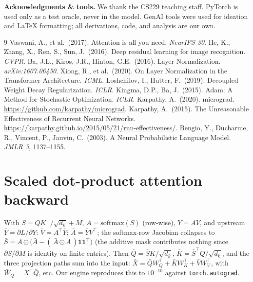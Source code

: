 \documentclass{article}
\begin{document}
\textbf{Acknowledgments \& tools.} We thank the CS229 teaching staff. PyTorch is used only as a test oracle, never in the model. GenAI tools were used for ideation and LaTeX formatting; all derivations, code, and analysis are our own.

{\footnotesize
\begin{thebibliography}{9}
 Vaswani, A., et al.\ (2017). Attention is all you need. \textit{NeurIPS 30}.
 He, K., Zhang, X., Ren, S., Sun, J.\ (2016). Deep residual learning for image recognition. \textit{CVPR}.
 Ba, J.L., Kiros, J.R., Hinton, G.E.\ (2016). Layer Normalization. \textit{arXiv:1607.06450}.
 Xiong, R., et al.\ (2020). On Layer Normalization in the Transformer Architecture. \textit{ICML}.
 Loshchilov, I., Hutter, F.\ (2019). Decoupled Weight Decay Regularization. \textit{ICLR}.
 Kingma, D.P., Ba, J.\ (2015). Adam: A Method for Stochastic Optimization. \textit{ICLR}.
 Karpathy, A.\ (2020). micrograd. \url{https://github.com/karpathy/micrograd}.
 Karpathy, A.\ (2015). The Unreasonable Effectiveness of Recurrent Neural Networks. \url{https://karpathy.github.io/2015/05/21/rnn-effectiveness/}.
 Bengio, Y., Ducharme, R., Vincent, P., Jauvin, C.\ (2003). A Neural Probabilistic Language Model. \textit{JMLR 3}, 1137--1155.
\end{thebibliography}
}

\appendix
\section{Scaled dot-product attention backward}\label{app:attn}
With $S=QK^\top/\sqrt{d_k}+M$, $A=\mathrm{softmax}(S)$ (row-wise), $Y=AV$, and upstream $\bar Y=\partial L/\partial Y$:
$\bar V = A^\top\bar Y$; $\bar A=\bar Y V^\top$; the softmax-row Jacobian collapses to $\bar S = A\odot\big(\bar A-(\,\bar A\odot A\,)\mathbf 1\mathbf 1^\top\big)$ (the additive mask contributes nothing since $\partial S/\partial M$ is identity on finite entries). Then $\bar Q=\bar S K/\sqrt{d_k}$, $\bar K=\bar S^\top Q/\sqrt{d_k}$, and the three projection paths sum into the input: $\bar X = \bar Q W_Q^\top+\bar K W_K^\top+\bar V W_V^\top$, with $\bar W_Q=X^\top\bar Q$, etc. Our engine reproduces this to $10^{-10}$ against \texttt{torch.autograd}.
\end{document}
